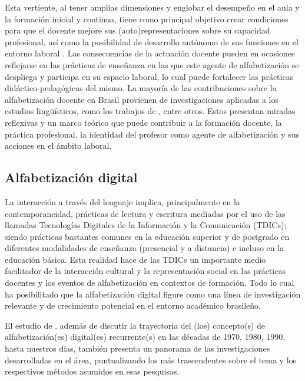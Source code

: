 \documentclass{textolivre}
\begin{document}
Esta vertiente, al tener amplias dimensiones y englobar el desempeño en el aula y la formación inicial y continua, tiene como principal objetivo crear condiciones para que el docente mejore sus (auto)representaciones sobre su capacidad profesional, así como la posibilidad de desarrollo autónomo de sus funciones en el entorno laboral \cite{kleiman_projetos_2009}. Las consecuencias de la actuación docente pueden en ocasiones reflejarse en las prácticas de enseñanza en las que este agente de alfabetización se despliega y participa en su espacio laboral, lo cual puede fortalecer las prácticas didáctico-pedagógicas del mismo.
La mayoría de las contribuciones sobre la alfabetización docente en Brasil provienen de investigaciones aplicadas a los estudios lingüísticos, como los trabajos de \textcite{kleiman_processos_2006, kleiman_projetos_2009, oliveira_variacao_2010, kleiman_estudos_2014}, entre otros. Estos presentan miradas reflexivas y un marco teórico que puede contribuir a la formación docente, la práctica profesional, la identidad del profesor como agente de alfabetización \cite{kleiman_processos_2006, kleiman_projetos_2009} y sus acciones en el ámbito laboral.

\subsection{Alfabetización digital}\label{sec-digital}
La interacción a través del lenguaje implica, principalmente en la contemporaneidad, prácticas de lectura y escritura mediadas por el uso de las llamadas Tecnologías Digitales de la Información y la Comunicación (TDICs); siendo prácticas bastantes comunes en la educación superior y de postgrado en diferentes modalidades de enseñanza (presencial y a distancia) e incluso en la educación básica. Esta realidad hace de las TDICs un importante medio facilitador de la interacción cultural y la representación social en las prácticas docentes y los eventos de alfabetización en contextos de formación. Todo lo cual ha posibilitado que la alfabetización digital figure como una línea de investigación relevante y de crecimiento potencial en el entorno académico brasileño.

El estudio de \textcite{araujo_letramento_2014}, además de discutir la trayectoria del (los) concepto(s) de alfabetización(es) digital(es) recurrente(s) en las décadas de 1970, 1980, 1990, hasta nuestros días, también presenta un panorama de las investigaciones desarrolladas en el área, puntualizando los más trascendentes sobre el tema y los respectivos métodos asumidos en esas pesquisas.
\end{document}
